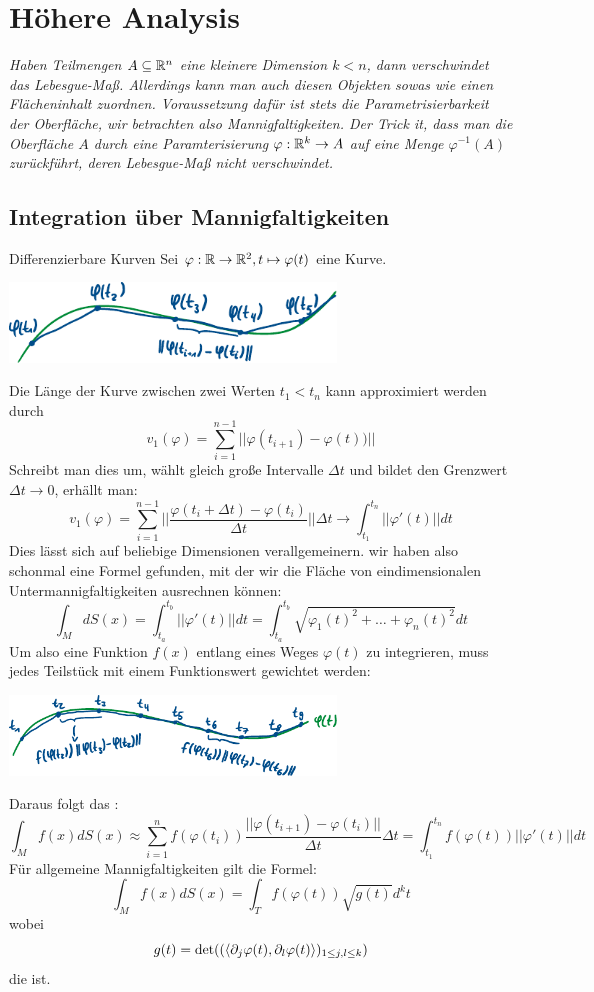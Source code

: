 \newpage
\section[Höhere Analysis]{Höhere Analysis}
\textit{Haben Teilmengen $A\subseteq \mathbb{R}^n$ eine kleinere Dimension $k<n$, dann verschwindet das Lebesgue-Maß. Allerdings kann man auch diesen Objekten sowas wie einen Flächeninhalt zuordnen. Voraussetzung dafür ist stets die Parametrisierbarkeit der Oberfläche, wir betrachten also Mannigfaltigkeiten. Der Trick it, dass man die Oberfläche $A$ durch eine Paramterisierung $\varphi: \mathbb{R}^k\rightarrow A$ auf eine Menge $\varphi^{-1}(A)$ zurückführt, deren Lebesgue-Maß nicht verschwindet.}
\subsection{Integration über Mannigfaltigkeiten}
\begin{Def}{Differenzierbare Kurven}
    Sei $\varphi: \mathbb{R} \rightarrow \mathbb{R}^2, t\mapsto \varphi(t)$ eine Kurve.
    \begin{center}
    \includegraphics[width=0.65\textwidth]{Dateien/Linienintegral_1.pdf}
\end{center}
    Die Länge der Kurve zwischen zwei Werten $t_1<t_n$ kann approximiert werden durch
    $$v_1(\varphi)=\sum_{i=1}^{n-1}||\varphi(t_{i+1})-\varphi(t))||$$
    Schreibt man dies um, wählt gleich große Intervalle $\Delta t$ und bildet den Grenzwert $\Delta t \rightarrow 0$, erhällt man:
    $$v_1(\varphi)=\sum_{i=1}^{n-1}||\frac{\varphi(t_i+\Delta t)-\varphi(t_i)}{\Delta t}||\Delta t \rightarrow \int_{t_1}^{t_n}||\varphi'(t)||dt$$
    Dies lässt sich auf beliebige Dimensionen verallgemeinern. wir haben also schonmal eine Formel gefunden, mit der wir die Fläche von eindimensionalen Untermannigfaltigkeiten ausrechnen können:
    $$\int_M dS(x)=\int_{t_a}^{t_b}||\varphi'(t)||dt=\int_{t_a}^{t_b}\sqrt{\varphi_1(t)^2+\dots+\varphi_n(t)^2}dt$$
    Um also eine Funktion $f(x)$ entlang eines Weges $\varphi(t)$ zu integrieren, muss jedes Teilstück mit einem Funktionswert gewichtet werden:
    \begin{center}
    \includegraphics[width=0.65\textwidth]{Dateien/Linienintegral_2.pdf}
\end{center}
    Daraus folgt das :
    $$\int_M f(x) dS(x) \approx \sum_{i=1}^n f(\varphi(t_i))\frac{||\varphi(t_{i+1})-\varphi(t_i)||}{\Delta t}\Delta t= \int_{t_1}^{t_n}f(\varphi(t))||\varphi'(t)||dt$$
    Für allgemeine Mannigfaltigkeiten gilt die Formel:
    $$\int_M f(x)dS(x) = \int_T f(\varphi(t)) \sqrt{g(t)}d^kt$$
    wobei $$g(t)=\det((\braket{\partial_j \varphi(t), \partial_l \varphi(t)})_{1\leq j, l\leq k})$$ die  ist.
\end{Def}
